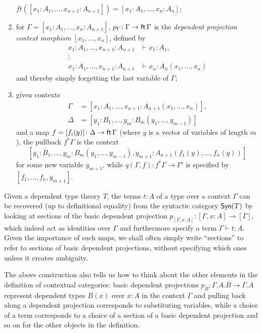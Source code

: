 \begin{construction}
\begin{enumerate}
      $ft([x_1:A_1,\ldots,x_{n+1}:A_{n+1}])=[x_1:A_1,\ldots,x_n:A_n]$;
    \item for $\Gamma=[x_1:A_1,\ldots,x_n:A_{n+1}]$,
      $p_{\Gamma}\colon\Gamma\rightarrow \operatorname{\mathsf{ft}}\Gamma$ is the \emph{dependent
      projection context morphism} $[x_1,\ldots,x_n]$, defined by
      \begin{align*}
        x_1:A_1,\ldots,x_{n+1}:A_{n+1} &\vdash x_1:A_1, \\
        \vdots & \\
        x_1:A_1,\ldots,x_{n+1}:A_{n+1} &\vdash x_n:A_n(x_1,\ldots,x_n)
      \end{align*}
      and thereby simply forgetting the last variable of $\Gamma$;
    \item given contexts
      \begin{align*}
        \Gamma &=[x_1:A_1,\ldots,x_{n+1}:A_{n+1}(x_1,\ldots,x_n)], \\
        \Delta &=[y_1:B_1,\ldots,y_m:B_m(y_1,\ldots,y_{m-1})]
      \end{align*}
      and a map $f=[f_i(y)]\colon\Delta\rightarrow\operatorname{\mathsf{ft}}\Gamma$ (where $y$ is a
      vector of variables of length $m$), the pullback $f^*\Gamma$ is the
      context
      \[[y_1:B_1,\ldots,y_m:B_m(y_1,\ldots,y_{m-1}),y_{m+1}:A_{n+1}(f_1(y),\ldots,f_n(y))]\]
      for some new variable $y_{m+1}$, while $q(\Gamma,f)\colon
      f^*\Gamma\rightarrow\Gamma'$ is specified by $[f_1,\ldots,f_n,y_{m+1}]$.
  \end{enumerate}
\end{construction}

\begin{rmk}
  Given a dependent type theory $T$, the terms $t:A$ of a type over a context
  $\Gamma$ can be recovered (up to definitional equality) from the syntactic
  category $\operatorname{\mathsf{Syn}}(T)$ by looking at sections of the basic dependent projection
  $p_{[\Gamma,x:A]}\colon[\Gamma,x:A]\rightarrow[\Gamma]$, which indeed act as
  identities over $\Gamma$ and furthermore specify a term $\Gamma\vdash t:A$.
  Given the importance of such maps, we shall often simply write ``sections'' to
  refer to sections of basic dependent projections, without specifying which ones
  unless it creates ambiguity.

  The above construction also tells us how to think about the other elements in
  the definition of contextual categories: basic dependent
  projections $p_B\colon\Gamma.A.B\rightarrow\Gamma.A$ represent dependent
  types $B(x)$ over $x:A$ in the context $\Gamma$ and pulling back along
  a dependent projection corresponds to substituting variables, while a choice of
  a term corresponds to a choice of a section of a basic dependent projection
  and so on for the other objects in the definition.
\end{rmk}

